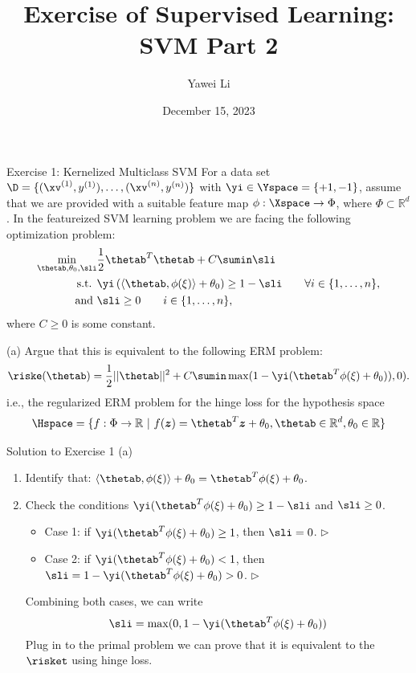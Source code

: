 \documentclass[aspectratio=169]{beamer}
\title[]{\textbf{Exercise of Supervised Learning: \\ SVM Part 2}}
\author{Yawei Li}
\institute[LMU]
{
\\
  \texttt{yawei.li@stat.uni-muenchen.de}
}
\date{December 15, 2023}
\newcommand{\zv}{\bm{z}}
\newcommand{\linearphixi}{\thetab^T \phixi + \theta_0}
\renewcommand{\phixi}{\phi(\xi)}
\begin{document}
\begin{frame}
\titlepage

\end{frame}

\begin{frame}{Exercise 1: Kernelized Multiclass SVM}
	\small
	For a data set $\D = \{(\xv^{(1)}, y^{(1)}), \ldots, (\xv^{(n)}, y^{(n)}) \}$ with $\yi \in \Yspace = \{+1, -1 \}$, assume that we are provided with a suitable feature map $\phi: \Xspace \to \Phi$, where $\Phi \subset \mathbb{R}^d$. In the featureized SVM learning problem we are facing the following optimization problem:
	\begin{align*}
		\min_{\thetab, \theta_0, \sli} &\frac{1}{2} \thetab^T \thetab + C \sumin \sli \\
		\text{s.t. } & \yi \left(\left\langle \thetab, \phixi \right\rangle  + \theta_0\right) \geq 1 - \sli \qquad \forall i \in \{1, \ldots, n \}, \\
		\text{and } & \sli \geq 0 \qquad i \in \{1, \ldots, n \},
	\end{align*}
	where $C \geq 0$ is some constant.
	
	(a) Argue that this is equivalent to the following ERM problem:
		\begin{align*}
			\riske(\thetab) = \frac{1}{2} ||\thetab||^2 + C\sumin \max(1 - \yi(\thetab^T \phixi + \theta_0)), 0).
		\end{align*}
		i.e., the regularized ERM problem for the hinge loss for the hypothesis space 
		\begin{align*}
			\Hspace = \{f: \Phi \to \mathbb{R} \ | \ f(\zv) = \thetab^T \zv + \theta_0, \thetab \in \mathbb{R}^d, \theta_0 \in \mathbb{R} \}
		\end{align*}
\end{frame}

\begin{frame}{Solution to Exercise 1 (a)}

	\begin{enumerate}
		\item Identify that: $\langle \thetab, \phixi \rangle + \theta_0 = \linearphixi$.
		\item Check the conditions $\yi (\linearphixi) \geq 1 - \sli$ and $\sli \geq 0$.
		\begin{itemize}
			\item Case 1: if $\yi (\linearphixi) \geq 1$, then $\sli = 0$. \qquad $\rhd$
			\item Case 2: if $\yi (\linearphixi) < 1$, then $\sli = 1 - \yi(\linearphixi) > 0$. \qquad $\rhd$
		\end{itemize}
		Combining both cases, we can write $$\sli = \max(0, 1 - \yi(\linearphixi))$$
		Plug in to the primal problem we can prove that it is equivalent to the $\risket$ using hinge loss.
	\end{enumerate}
\end{frame}
\end{document}
